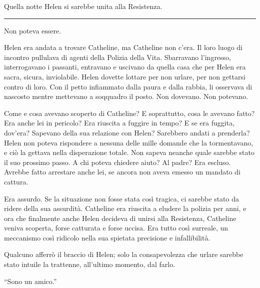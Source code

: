 Quella notte Helen si sarebbe unita alla Resistenza.

\plainbreak{1}

Non poteva essere.

Helen era andata a trovare Catheline, ma Catheline non c'era. Il loro luogo di incontro pullulava di
agenti della Polizia della Vita. Sbarravano l'ingresso, interrogavano i passanti, entravano e
uscivano da quella casa che per Helen era sacra, sicura, inviolabile. Helen dovette lottare per non
urlare, per non gettarsi contro di loro. Con il petto infiammato dalla paura e dalla rabbia, li
osservava di nascosto mentre mettevano a soqquadro il posto. Non dovevano. Non potevano.

Come e cosa avevano scoperto di Catheline? E soprattutto, cosa le avevano fatto? Era anche lei in
pericolo? Era riuscita a fuggire in tempo? E se era fuggita, dov'era? Sapevano della sua relazione
con Helen? Sarebbero andati a prenderla? Helen non poteva rispondere a nessuna delle mille domande
che la tormentavano, e ciò la gettava nella disperazione totale. Non sapeva neanche quale sarebbe
stato il suo prossimo passo. A chi poteva chiedere aiuto? Al padre? Era escluso. Avrebbe fatto
arrestare anche lei, se ancora non aveva emesso un mandato di cattura.

Era assurdo. Se la situazione non fosse stata così tragica, ci sarebbe stato da ridere della sua
assurdità. Catheline era riuscita a eludere la polizia per anni, e ora che finalmente anche Helen
decideva di unirsi alla Resistenza, Catheline veniva scoperta, forse catturata e forse uccisa. Era
tutto così surreale, un meccanismo così ridicolo nella sua spietata precisione e infallibilità.

Qualcuno afferrò il braccio di Helen; solo la consapevolezza che urlare sarebbe stato intuile la
trattenne, all'ultimo momento, dal farlo.

``Sono un amico.''
